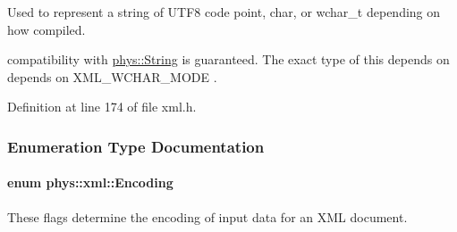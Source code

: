 Used to represent a string of UTF8 code point, char, or wchar\_\-t depending on how compiled. 

compatibility with \hyperlink{namespacephys_aa03900411993de7fbfec4789bc1d392e}{phys::String} is guaranteed. The exact type of this depends on depends on XML\_\-WCHAR\_\-MODE . 

Definition at line 174 of file xml.h.



\subsubsection{Enumeration Type Documentation}
\hypertarget{namespacephys_1_1xml_a420f5de782438f88160321385bea2015}{
\paragraph[{Encoding}]{\setlength{\rightskip}{0pt plus 5cm}enum {\bf phys::xml::Encoding}}\hfill}
\label{d9/d27/namespacephys_1_1xml_a420f5de782438f88160321385bea2015}


These flags determine the encoding of input data for an XML document. 

